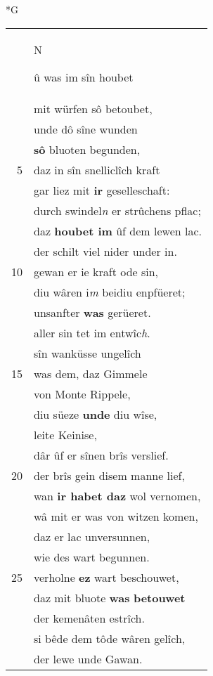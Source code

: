 \documentclass[8pt,a4paper,notitlepage]{article}
\begin{document}
\begin{table}[ht]
\begin{minipage}[t]{0.5\linewidth}
\small
\begin{center}*G
\end{center}
\begin{tabular}{rl}
 & \begin{large}N\end{large}û was im sîn houbet\\ 
 & mit würfen sô betoubet,\\ 
 & unde dô sîne wunden\\ 
 & \textbf{sô} bluoten begunden,\\ 
5 & daz in sîn snelliclîch kraft\\ 
 & gar liez mit \textbf{ir} geselleschaft:\\ 
 & durch swindel\textit{n} er strûchens pflac;\\ 
 & daz \textbf{houbet im} ûf dem lewen lac.\\ 
 & der schilt viel nider under in.\\ 
10 & gewan er ie kraft ode sin,\\ 
 & diu wâren i\textit{m} beidiu enpfüeret;\\ 
 & unsanfter \textbf{was} gerüeret.\\ 
 & aller sin tet im entwîc\textit{h}.\\ 
 & sîn wanküsse ungelîch\\ 
15 & was dem, daz Gimmele\\ 
 & von Monte Rippele,\\ 
 & diu süeze \textbf{unde} diu wîse,\\ 
 & leite Keinise,\\ 
 & dâr ûf er sînen brîs verslief.\\ 
20 & der brîs gein disem manne lief,\\ 
 & wan \textbf{ir habet daz} wol vernomen,\\ 
 & wâ mit er was von witzen komen,\\ 
 & daz er lac unversunnen,\\ 
 & wie des wart begunnen.\\ 
25 & verholne \textbf{ez} wart beschouwet,\\ 
 & daz mit bluote \textbf{was} \textbf{betouwet}\\ 
 & der kemenâten estrîch.\\ 
 & si bêde dem tôde wâren gelîch,\\ 
 & der lewe unde Gawan.\\ 

\end{tabular}
\end{minipage}
\end{table}
\end{document}
